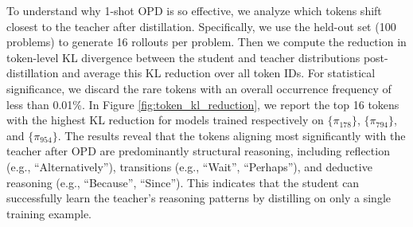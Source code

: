 To understand why 1-shot OPD is so effective, we analyze which tokens shift closest to the teacher after distillation. Specifically, we use the held-out set (100 problems) to generate 16 rollouts per problem. Then we compute the reduction in token-level KL divergence between the student and teacher distributions post-distillation and average this KL reduction over all token IDs. For statistical significance, we discard the rare tokens with an overall occurrence frequency of less than 0.01\%. In Figure \ref{fig:token_kl_reduction}, we report the top 16 tokens with the highest KL reduction for models trained respectively on $\{\pi_{178}\}$, $\{\pi_{794}\}$, and $\{\pi_{954}\}$. The results reveal that the tokens aligning most significantly with the teacher after OPD are predominantly structural reasoning, including reflection (e.g., ``Alternatively''), transitions (e.g., ``Wait'', ``Perhaps''), and deductive reasoning (e.g., ``Because'', ``Since''). This indicates that the student can successfully learn the teacher's reasoning patterns by distilling on only a single training example.



